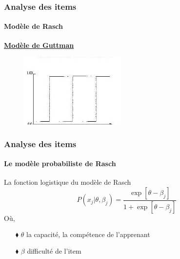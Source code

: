 \documentclass[aspectratio=169,professionalfonts, 12pt]{beamer}
\begin{document}
\begin{frame}
  \frametitle{Analyse des items}
  \framesubtitle{Modèle de Rasch}
  \centering \textbf{\underline{Modèle de Guttman}} \\
  \justifying 
  \begin{minipage}{\textwidth}
    \begin{figure}
      \includegraphics[width=0.475\textwidth]{images/etat_art/guttman_model.jpg}
   \end{figure}
  \end{minipage} 
\end{frame}

\begin{frame}
  \frametitle{Analyse des items}
  \framesubtitle{Le modèle probabiliste de Rasch}
  \justifying 
  \begin{minipage}{\textwidth}
  \begin{block}{La fonction logistique du modèle de Rasch}
  \begin{equation}P(x_{j}| \theta, \beta_{j}) = \frac{\exp \left[\theta - \beta_{j} \right]  }{1+ \exp \left[ \theta - \beta_{j} \right] }
  \end{equation}
  Où, \\
  \begin{itemize}
    \item[$\blacklozenge$] \(\displaystyle \theta \) la capacité, la compétence de l'apprenant 
    \item[$\blacklozenge$] \(\displaystyle \beta \) difficulté de l'item
  \end{itemize}
  \end{block}  
  \end{minipage} 
\end{frame}
\end{document}
